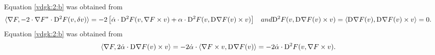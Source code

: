 Equation \eqref{vdgk:2:b} was obtained from
\begin{subequations}
    \begin{align}
        \skap{ \grad{F} }{ -2 \mult \darg{F} \mult \diff{2}{F}( v, \vardiff v ) }
        &=
        - 2 \left[ \dot{ \alpha }  \mult  \diff{2}{F}( v, \grad{F} \times v )  +
        \alpha  \mult \diff{2}{F}( v, \diff{}{\grad{F}}( v ) \times v ) \right]
        \nonumber
    \end{align}
    and
    \begin{align*}
        \diff{2}{F}( v, \diff{}{\grad{F}}( v ) \times v )  =
        \skap{ \diff{}{\grad{F}}( v ) }{ \diff{}{\grad{F}}( v ) \times v }  =  0 .
    \end{align*}
\end{subequations}
Equation \eqref{vdgk:2:b} was obtained from
\begin{align*}
    \langle  \nabla F ,  2 \dot{ \alpha } \cdot \mathrm{D}^{  }\nabla F( v ) \times v  \rangle   =
    - 2 \dot{ \alpha } \cdot
    \langle  \nabla F \times v ,  \mathrm{D}^{  } \nabla F( v )   \rangle   =
    - 2 \dot{ \alpha } \cdot \mathrm{D}^{ 2 }F( v, \nabla F \times v ) .
\end{align*}





